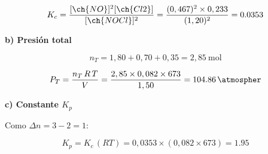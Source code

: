 \begin{exerciseEVAU}
\begin{solu}
        \begin{equation*}
            K_c = \dfrac{[\ch{NO}]^2[\ch{Cl2}]}{[\ch{NOCl}]^2} = \dfrac{(0,467)^2 \times 0,233}{(1,20)^2} = \num{0.0353}
        \end{equation*}

        \textbf{b) Presión total}

        \begin{equation*}
            n_T = 1,80+0,70+0,35 = 2,85 \ \text{mol}
        \end{equation*}

        \begin{equation*}
            P_T = \dfrac{n_T\, R\, T}{V} = \dfrac{2,85 \times 0,082 \times 673}{1,50} = \SI{104.86}{\atmospher}
        \end{equation*}

        \textbf{c) Constante \(K_p\)}

        Como \(\Delta n = 3-2=1\):

        \begin{equation*}
            K_p = K_c\, (RT) = 0,0353 \times (0,082 \times 673) = \num{1.95}
        \end{equation*}

    \end{solu}

\end{exerciseEVAU}

